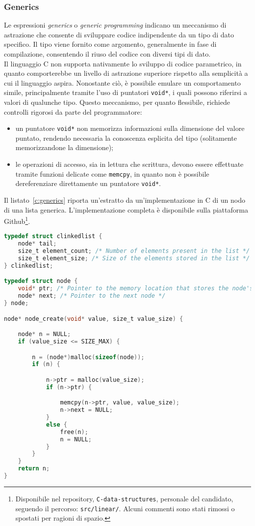 \subsubsection{Generics}
Le espressioni \textit{generics} o \textit{generic programming} indicano un meccanismo di astrazione che consente di sviluppare codice indipendente da un tipo di dato specifico.
Il tipo viene fornito come argomento, generalmente in fase di compilazione, consentendo il riuso del codice con diversi tipi di dato. \hfill
\vspace{8pt}\\
\noindent Il linguaggio C non supporta nativamente lo sviluppo di codice parametrico, in quanto comporterebbe un livello di astrazione superiore rispetto alla
semplicità a cui il linguaggio aspira. Nonostante ciò, è possibile emulare un comportamento simile, principalmente tramite l'uso di puntatori \texttt{void*}, i quali possono riferirsi a valori di qualunche tipo.
Questo meccanismo, per quanto flessibile, richiede controlli rigorosi da parte del programmatore: 
\begin{itemize}
    \item un puntatore \texttt{void*} non memorizza informazioni sulla dimensione del valore puntato, rendendo necessaria la conoscenza esplicita del tipo (solitamente memorizzandone la dimensione);
    \item le operazioni di accesso, sia in lettura che scrittura, devono essere effettuate tramite funzioni delicate come \texttt{memcpy}, in quanto non è possibile dereferenziare direttamente un puntatore \texttt{void*}.
\end{itemize}
Il listato~\ref{c:generics} riporta un'estratto da un'implementazione in C di un nodo di una lista generica. L'implementazione completa è disponibile sulla piattaforma Github\cite{github-ds-repo}\footnote{Disponibile nel repository, \texttt{C-data-structures}, personale del candidato, seguendo il percorso: \texttt{src/linear/}. Alcuni commenti sono stati rimossi o spostati per ragioni di spazio.}.
\begin{lstlisting}[language=C, float, caption={Programmazione generica in C}, label={c:generics}]
typedef struct clinkedlist {
	node* tail;
	size_t element_count; /* Number of elements present in the list */
	size_t element_size; /* Size of the elements stored in the list */
} clinkedlist;

typedef struct node {
	void* ptr; /* Pointer to the memory location that stores the node's value */
	node* next; /* Pointer to the next node */
} node;

node* node_create(void* value, size_t value_size) {

	node* n = NULL;
	if (value_size <= SIZE_MAX) {

		n = (node*)malloc(sizeof(node));
		if (n) {

			n->ptr = malloc(value_size);
			if (n->ptr) {

				memcpy(n->ptr, value, value_size);
				n->next = NULL;
			}
			else {
				free(n);
				n = NULL;
			}
		}
	}
	return n;
}
\end{lstlisting}
